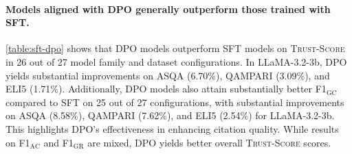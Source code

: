 \documentclass{article} %
\newcommand{\method}[0]{\textsc{Trust-Align}}
\newcommand{\metric}[0]{\textsc{Trust-Score}}
\begin{document}

\paragraph{Models aligned with DPO generally outperform those trained with SFT.}
\cref{table:sft-dpo} shows that DPO models outperform SFT models on \metric{} in 26 out of 27 model family and dataset configurations. In LLaMA-3.2-3b, DPO yields substantial improvements on ASQA (6.70\%), QAMPARI (3.09\%), and ELI5 (1.71\%). Additionally, DPO models also attain substantially better F1$_{\text{GC}}$ compared to SFT on 25 out of 27 configurations, with substantial improvements on ASQA (8.58\%), QAMPARI (7.62\%), and ELI5 (2.54\%) for LLaMA-3.2-3b. This highlights DPO's effectiveness in enhancing citation quality. While results on F1$_{\text{AC}}$ and F1$_{\text{GR}}$ are mixed, DPO yields better overall \metric{} scores.


\end{document}

